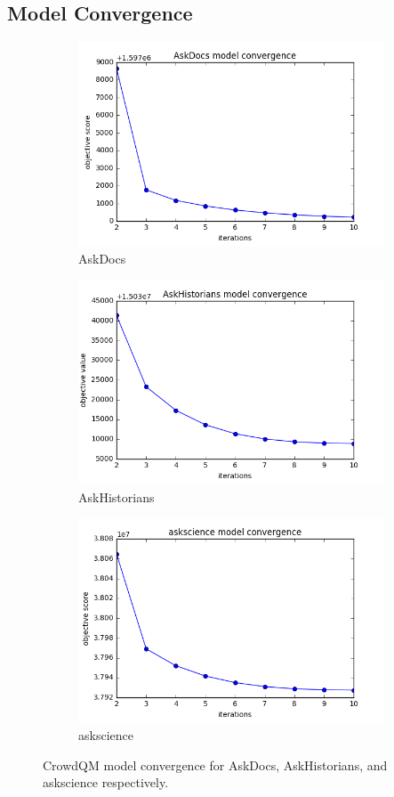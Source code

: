 \subsection{Model Convergence}
\begin{figure}[!h]
\begin{subfigure}{.5\linewidth}
  \centering
  \includegraphics[width=0.9\linewidth]{images/AskDocs_model_convergence.png}
  \caption{AskDocs}
  \label{fig:AskDocsfig1}
\end{subfigure}%
\begin{subfigure}{.5\linewidth}
  \centering
  \includegraphics[width=0.9\linewidth]{images/AskHistorians_model_convergence.png}
  \caption{AskHistorians}
  \label{fig:AskHistoriansfig1}
\end{subfigure}
\hspace{6em}
\begin{subfigure}{\textwidth}
  \centering
  \includegraphics[width=0.49\linewidth]{images/askscience_model_convergence.png}
  \caption{askscience}
  \label{fig:asksciencefig1}
\end{subfigure}
\caption{CrowdQM model convergence for AskDocs, AskHistorians, and askscience respectively.}
\label{fig:convergence}
\end{figure}
